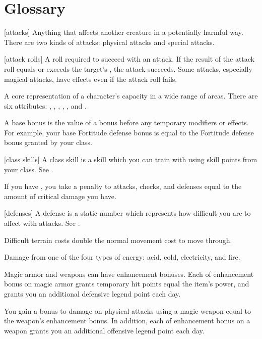 \chapter{Glossary}\label{Glossary}

[attacks] Anything that affects another creature in a potentially harmful way. There are two kinds of attacks: physical attacks and special attacks.

[attack rolls] A roll required to succeed with an attack. If the result of the attack roll equals or exceeds the target's , the attack succeeds. Some attacks, especially magical attacks, have effects even if the attack roll fails.

 A core representation of a character's capacity in a wide range of areas. There are six attributes: , , , , , and .

 A base bonus is the value of a bonus before any temporary modifiers or effects. For example, your base Fortitude defense bonus is equal to the Fortitude defense bonus granted by your class.

[class skills] A class skill is a skill which you can train with using skill points from your class. See .

 If you have , you take a penalty to attacks, checks, and defenses equal to the amount of critical damage you have.

[defenses] A defense is a static number which represents how difficult you are to affect with attacks. See .

 Difficult terrain costs double the normal movement cost to move through.

 Damage from one of the four types of energy: acid, cold, electricity, and fire.

 Magic armor and weapons can have enhancement bonuses.
Each  of enhancement bonus on magic armor grants temporary hit points equal the item's power, and grants you an additional defensive legend point each day.

You gain a bonus to damage on physical attacks using a magic weapon equal to the weapon's enhancement bonus.
In addition, each  of enhancement bonus on a weapon grants you an additional offensive legend point each day.

